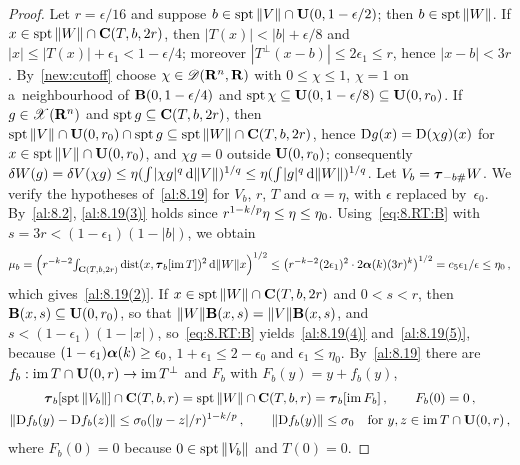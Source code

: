 \begin{proof}
    Let $r = \epsilon/16$ and suppose $b \in \operatorname{spt} \|V\| \cap \mathbf{U}(0,1 - \epsilon/2)$; then $b \in
    \operatorname{spt} \|W\|$. If $x \in \operatorname{spt} \|W\| \cap \mathbf{C} ( T, b, 2r )$, then $|T(x)| < |b| + \epsilon/8$ and
    $|x| \le |T(x)| + \epsilon_1 < 1 - \epsilon/4$; moreover $|T^\perp(x - b)| \le 2 \epsilon_1 \le
    r$, hence $|x - b| < 3r$. By~\ref{new:cutoff} choose $\chi \in \mathscr{D}(\mathbf{R}^{n},\mathbf{R})$ with
    $0 \le \chi \le 1$, $\chi = 1$ on a~neighbourhood of $\mathbf{B}(0,1 - \epsilon/4)$ and $\operatorname{spt} \chi \subseteq \mathbf{U}(0,1
    - \epsilon/8) \subseteq \mathbf{U}(0,r_0)$. If $g \in \mathscr{X}(\mathbf{R}^{n})$ and $\operatorname{spt} g \subseteq
    \mathbf{C} ( T, b, 2r )$, then $\operatorname{spt} \|V\| \cap \mathbf{U}(0,r_0) \cap \operatorname{spt} g \subseteq \operatorname{spt} \|W\| \cap
    \mathbf{C} ( T, b, 2r )$, hence $\mathrm{D} g(x) = \mathrm{D}(\chi g)(x)$ for $x \in \operatorname{spt} \|V\| \cap
    \mathbf{U}(0,r_0)$, and $\chi g = 0$ outside $\mathbf{U}(0,r_0)$; consequently $\delta W(g) = \delta
    V(\chi g) \le \eta ({\textstyle\int_{}^{}} |\chi g|^q \,\mathrm{d} \|V\|)^{1/q} \le \eta ({\textstyle\int_{}^{}} |g|^q \,\mathrm{d}
    \|W\|)^{1/q}$. Let $V_b = \boldsymbol{\tau}_{-b \#} W$.
    We verify the hypotheses of~\ref{al:8.19} for $V_b$, $r$, $T$ and $\alpha = \eta$, with
    $\epsilon$ replaced by~$\epsilon_0$. By~\ref{al:8.2}, \ref{al:8.19(3)} holds since $r^{1 -
    k/p} \eta \le \eta \le \eta_0$. Using~\eqref{eq:8.RT:B} with $s = 3r < (1 - \epsilon_1)(1 -
    |b|)$, we obtain
    \begin{displaymath}
        \mu_b = \Big( r^{-k-2} {\textstyle\int_{\mathbf{C} ( T, b, 2r )}^{}} \operatorname{dist}(x, \boldsymbol{\tau}_{b}[\operatorname{im} T])^2 \,\mathrm{d}
        \|W\| x \Big)^{1/2} \le \big( r^{-k-2} (2 \epsilon_1)^2 \cdot 2 \boldsymbol{\alpha}(k) (3
        r)^{k} \big)^{1/2} = c_5 \epsilon_1 / \epsilon \le \eta_0 \,,
    \end{displaymath}
    which gives~\ref{al:8.19(2)}. If $x \in \operatorname{spt} \|W\| \cap \mathbf{C} ( T, b, 2r )$ and $0 < s < r$, then
    $\mathbf{B}(x,s) \subseteq \mathbf{U}(0,r_0)$, so that $\|W\| \mathbf{B}(x,s) = \|V\| \mathbf{B}(x,s)$, and
    $s < (1 - \epsilon_1)(1 - |x|)$,
    so~\eqref{eq:8.RT:B} yields~\ref{al:8.19(4)} and~\ref{al:8.19(5)}, because $(1 - \epsilon_1)
    \boldsymbol{\alpha}(k) \ge \epsilon_0$, $1 + \epsilon_1 \le 2 - \epsilon_0$ and $\epsilon_1 \le
    \eta_0$. By~\ref{al:8.19} there are $f_b : \operatorname{im} T \cap \mathbf{U}(0,r) \to \operatorname{im} T^\perp$ and $F_b$
    with $F_b(y) = y + f_b(y)$,
    \begin{gather}
        \label{eq:8.RT:C}
        \boldsymbol{\tau}_{b}[\operatorname{spt} \|V_b\|] \cap \mathbf{C} ( T, b, r ) = \operatorname{spt} \|W\| \cap \mathbf{C} ( T, b, r ) = \boldsymbol{\tau}_{b}[\operatorname{im}
        F_b] \,, \qquad F_b(0) = 0 \,, \\
        \label{eq:8.RT:D}
        \|\mathrm{D} f_b(y) - \mathrm{D} f_b(z)\| \le \sigma_0 (|y - z|/r)^{1 - k/p} \,, \qquad \|\mathrm{D} f_b(y)\|
        \le \sigma_0 \quad \text{for $y, z \in \operatorname{im} T \cap \mathbf{U}(0,r)$} \,,
    \end{gather}
    where $F_b(0) = 0$ because $0 \in \operatorname{spt} \|V_b\|$ and $T(0) = 0$.


\end{proof}
